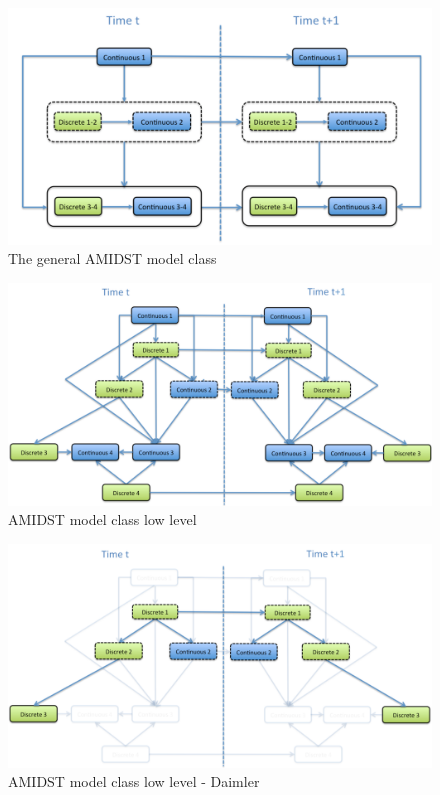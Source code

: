 \begin{figure}[ht!]
\begin{center}
\includegraphics[scale=0.4]{./figures/AMIDSTModelClassGeneral}
\caption{\label{Figure:AMIDSTModelClassHighLevel} The general AMIDST model class}
\end{center}
\end{figure}

\begin{figure}[ht!]
\begin{center}
\includegraphics[scale=0.39]{./figures/AMIDSTModelClass}
\caption{\label{Figure:AMIDSTModelClass} AMIDST model class low level}
\end{center}
\end{figure}

\begin{figure}[ht!]
\begin{center}
\includegraphics[scale=0.39]{./figures/AMIDSTModelClassDaimler}
\caption{\label{Figure:AMIDSTModelClassDaimler} AMIDST model class low level - Daimler}
\end{center}
\end{figure}

